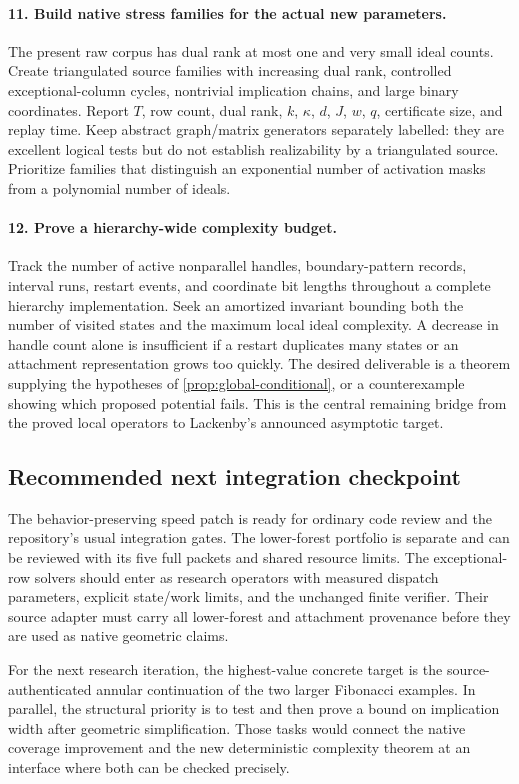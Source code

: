 \paragraph{11. Build native stress families for the actual new parameters.}
The present raw corpus has dual rank at most one and very small ideal
counts.  Create triangulated source families with increasing dual rank,
controlled exceptional-column cycles, nontrivial implication chains, and
large binary coordinates.  Report $T$, row count, dual rank, $k$, $\kappa$,
$d$, $J$, $w$, $q$, certificate size, and replay time.  Keep abstract
graph/matrix generators separately labelled: they are excellent logical
tests but do not establish realizability by a triangulated source.
Prioritize families that distinguish an exponential number of activation
masks from a polynomial number of ideals.

\paragraph{12. Prove a hierarchy-wide complexity budget.}
Track the number of active nonparallel handles, boundary-pattern records,
interval runs, restart events, and coordinate bit lengths throughout a
complete hierarchy implementation.  Seek an amortized invariant bounding
both the number of visited states and the maximum local ideal complexity.
A decrease in handle count alone is insufficient if a restart duplicates
many states or an attachment representation grows too quickly.  The desired
deliverable is a theorem supplying the hypotheses of
\cref{prop:global-conditional}, or a counterexample showing which proposed
potential fails.  This is the central remaining bridge from the proved
local operators to Lackenby's announced asymptotic target.

\subsection{Recommended next integration checkpoint}

The behavior-preserving speed patch is ready for ordinary code review and
the repository's usual integration gates.  The lower-forest portfolio is
separate and can be reviewed with its five full packets and shared resource
limits.  The exceptional-row solvers should enter as research operators
with measured dispatch parameters, explicit state/work limits, and the
unchanged finite verifier.  Their source adapter must carry all lower-forest
and attachment provenance before they are used as native geometric claims.

For the next research iteration, the highest-value concrete target is the
source-authenticated annular continuation of the two larger Fibonacci
examples.  In parallel, the structural priority is to test and then prove
a bound on implication width after geometric simplification.  Those tasks
would connect the native coverage improvement and the new deterministic
complexity theorem at an interface where both can be checked precisely.
